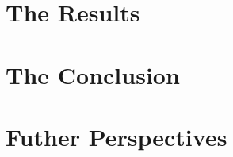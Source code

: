 \documentclass[a4paper]{article}
\begin{document}
\section{The Results}


\section{The Conclusion}

\section{Futher Perspectives}











\end{document}
